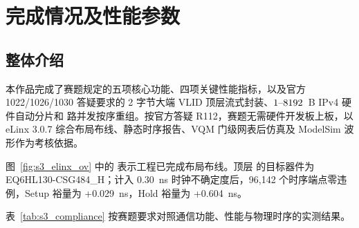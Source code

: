 
\section{完成情况及性能参数}

\subsection{整体介绍}


本作品完成了赛题规定的五项核心功能、四项关键性能指标，以及官方 1022/1026/1030 答疑要求的 2 字节大端 VLID 顶层流式封装、$1\text{--}8192$~B IPv4 硬件自动分片和 \ReasmContexts{} 路并发按序重组。按官方答疑 R112，赛题无需硬件开发板上板，以 eLinx 3.0.7 综合布局布线、静态时序报告、VQM 门级网表后仿真及 ModelSim 波形作为考核依据。

图~\ref{fig:s3_elinx_ov} 中的  表示工程已完成布局布线。顶层  的目标器件为 EQ6HL130-CSG484\_H；计入 0.30~ns 时钟不确定度后，96,142 个时序端点零违例，Setup 裕量为 +0.029~ns，Hold 裕量为 +0.604~ns。


表~\ref{tab:s3_compliance} 按赛题要求对照通信功能、性能与物理时序的实测结果。

